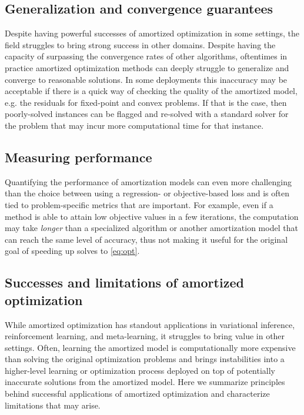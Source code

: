 \documentclass[twoside,11pt]{article}
\newcommand{\eg}{e.g.\xspace}
\begin{document}
\subsection{Generalization and convergence guarantees}
\label{sec:generalization}
Despite having powerful successes of amortized optimization in
some settings, the field struggles to bring strong success
in other domains.
Despite having the capacity of surpassing the convergence rates of
other algorithms, oftentimes in practice amortized optimization
methods can deeply struggle to generalize and converge to
reasonable solutions.
In some deployments this inaccuracy may be acceptable if there
is a quick way of checking the quality of the amortized model,
\eg the residuals for fixed-point and convex problems.
If that is the case, then poorly-solved instances can be flagged
and re-solved with a standard solver for the problem that
may incur more computational time for that instance.

\subsection{Measuring performance}
Quantifying the performance of amortization models can even more
challenging than the choice between using a regression- or
objective-based loss and is often tied to
problem-specific metrics that are important.
For example, even if a method is able to attain low objective values
in a few iterations, the computation may take \emph{longer} than
a specialized algorithm or another amortization model that can reach
the same level of accuracy, thus not making it useful for the
original goal of speeding up solves to \cref{eq:opt}.

\subsection{Successes and limitations of amortized optimization}
While amortized optimization has standout applications in
variational inference, reinforcement learning, and meta-learning,
it struggles to bring value in other settings.
Often, learning the amortized model is computationally more
expensive than solving the original optimization problems and
brings instabilities into a higher-level learning or optimization
process deployed on top of potentially inaccurate solutions
from the amortized model.
Here we summarize principles behind successful applications
of amortized optimization and characterize limitations that
may arise.
\end{document}
